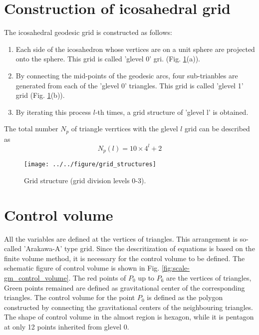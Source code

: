 \section{Construction of icosahedral grid}
The icosahedral geodesic grid is constructed as follows:
\begin{enumerate}
  \item Each side of the icosahedron whose vertices are on a unit sphere are
    projected onto the sphere. This grid is called 'glevel 0' gri. (Fig. \ref{fig:scale-gm_grid}(a)).
  \item By connecting the mid-points of the geodesic arcs, four
      sub-trianbles are generated from each of the 'glevel 0' triangles. This
      grid is called 'glevel 1' grid (Fig. \ref{fig:scale-gm_grid}(b)).
  \item By iterating this process $l$-th times, a grid structure of 'glevel l'
    is obtained. 
\end{enumerate}
The total number $N_p$ of triangle verrtices with the glevel $l$ grid can be
described as 
\begin{equation}
  N_p(l) = 10 \times 4^l + 2 \nonumber
\end{equation}

\begin{figure}[H]
  \begin{center}
    \texttt{[image: ../../figure/grid\_structures]}
    \caption{Grid structure (grid division levels 0-3).}
    \label{fig:scale-gm_grid}
  \end{center}
\end{figure}


\section{Control volume}
All the  variables are defined at the vertices of triangles. This arrangement
is so-called 'Arakawa-A' type grid. Since the descritization of equations is
based on the finite volume method, it is necessary for the control volume to
be defined. The schematic figure of control volume is shown in Fig. \ref{fig:scale-gm_control_volume}. The
red points of $P_0$ up to $P_6$ are the vertices of triangles, Green points
remained are defined as gravitational center of the corresponding
triangles. The control volume for the point $P_0$ is defined as the polygon
constructed by connecting the gravitational centers of the neighbouring
triangles. The shape of control volume in the almost region is hexagon, while
it is pentagon at only 12 points inherited from glevel 0.

